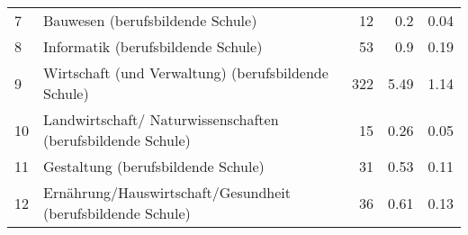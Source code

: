 \begin{longtable}{lXrrr}
     7 &
     \multicolumn{1}{X}{ Bauwesen (berufsbildende Schule)   } &


       \num{12} &
       \num[round-mode=places,round-precision=2]{0,2} &
         \num[round-mode=places,round-precision=2]{0,04} \\

     8 &
     \multicolumn{1}{X}{ Informatik (berufsbildende Schule)   } &


       \num{53} &
       \num[round-mode=places,round-precision=2]{0,9} &
         \num[round-mode=places,round-precision=2]{0,19} \\

     9 &
     \multicolumn{1}{X}{ Wirtschaft (und Verwaltung) (berufsbildende Schule)   } &


       \num{322} &
       \num[round-mode=places,round-precision=2]{5,49} &
         \num[round-mode=places,round-precision=2]{1,14} \\

     10 &
     \multicolumn{1}{X}{ Landwirtschaft/ Naturwissenschaften (berufsbildende Schule)   } &


       \num{15} &
       \num[round-mode=places,round-precision=2]{0,26} &
         \num[round-mode=places,round-precision=2]{0,05} \\

     11 &
     \multicolumn{1}{X}{ Gestaltung (berufsbildende Schule)   } &


       \num{31} &
       \num[round-mode=places,round-precision=2]{0,53} &
         \num[round-mode=places,round-precision=2]{0,11} \\

     12 &
     \multicolumn{1}{X}{ Ernährung/Hauswirtschaft/Gesundheit (berufsbildende Schule)   } &


       \num{36} &
       \num[round-mode=places,round-precision=2]{0,61} &
         \num[round-mode=places,round-precision=2]{0,13} \\


\end{longtable}
